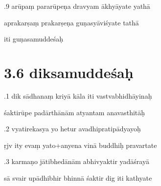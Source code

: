 \documentclass[article,12pt,a4paper]{memoir}%
\newcounter{parCount}
\begin{document}
	  
	  \pstart {}.9 arūpaṃ pararūpeṇa dravyam ākhyāyate yathā 
	{}
	\pend%
      

	  
	  \pstart \leavevmode%
	aprakarṣaṃ prakarṣeṇa guṇasyāviśyate tathā 
	{}
	\pend%
      

	  
	  \pstart \leavevmode%
	iti guṇasamuddeśaḥ
	{}
	\pend%
      
	  
	
\chapter[{3.6 diksamuddeśaḥ}][{3.6 diksamuddeśaḥ}]{ 3.6 diksamuddeśaḥ}

	  
	  \pstart {}.1 dik sādhanaṃ kriyā kāla iti vastvabhidhāyinaḥ 
	{}
	\pend%
      

	  
	  \pstart \leavevmode%
	śaktirūpe padārthānām atyantam anavasthitāḥ 
	{}
	\pend%
      

	  
	  \pstart {}.2 vyatirekasya yo hetur avadhipratipādyayoḥ 
	{}
	\pend%
      

	  
	  \pstart \leavevmode%
	ṛjv ity evaṃ yato+anyena vinā buddhiḥ pravartate 
	{}
	\pend%
      

	  
	  \pstart {}.3 karmaṇo jātibhedānām abhivyaktir yadāśrayā 
	{}
	\pend%
      

	  
	  \pstart \leavevmode%
	sā svair upādhibhir bhinnā śaktir dig iti kathyate 
	{}
	\pend%
      
\end{document}
